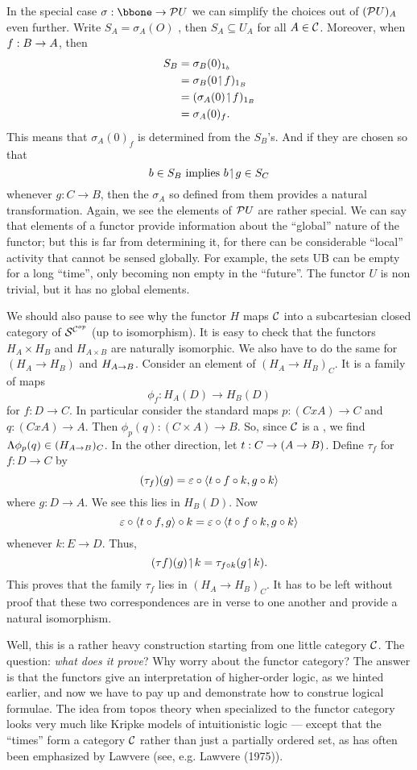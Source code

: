 In the special case $\sigma :\bbone \to \PU$ we can simplify the choices out of $(\mathcal P U)_A$
even further. Write $S_A= \sigma_A(O)$ , then $S_A\subseteq U_A$ for all $A \in \mathcal C$.
Moreover, when $f: B \rightarrow A$, then
\begin{align*}
S_B &= \sigma_B(0)_{{\mathrm 1}_b}\\
&= \sigma_B(0 \!\upharpoonleft\! f)_{{\mathrm 1} _B}\\
&= (\sigma_A(0) \!\upharpoonleft\! f)_{{\mathrm 1} _B}\\
&= \sigma_A(0)_f .
\end{align*}
This means that $\sigma_A(0)_f$ is determined from the $S_B$'s. And if they are chosen so
that
$$
b \in S_B {\textrm{ implies }} b \!\upharpoonleft\! g \in S_C
$$
whenever $g: C\to B$, then the $\sigma_A$ so defined from them provides a natural
transformation. Again, we see the elements of $\mathcal P U$ are rather special. We can say that
elements of a functor provide information about the ``global'' nature of the functor; but
this is far from determining it, for there can be considerable ``local'' activity that
cannot be sensed globally. For example, the sets UB can be empty for a long ``time'', only
becoming non empty in the ``future''. The functor $U$ is non trivial, but it has no global
elements.

We should also pause to see why the functor $H$ maps $\mathcal C$ into a subcartesian closed
category of $\mathcal S^{\mathcal C^{op}}$ (up to isomorphism). It is easy to check that the functors $H_A \times
H_B$ and $H_{A \times B}$ are naturally isomorphic. We also have to do the same for $(H_A
\to H_B)$ and $H_{A \rightarrow B}$. Consider an element of $(H_A\to H_B)_C$. It is a family of maps
$$
\phi_f : H_A(D) \to H_B(D)
$$
for $f: D\to C$. In particular consider the standard maps $p: (C x A) \to C$ and $q : (C x
A)\to A$. Then $\phi_p(q) : (C \times A)\to B$. So, since $\mathcal C$ is a \ccc, we find
$\Lambda\phi_p(q) \in (H_{A \rightarrow B})_C$. In the other direction, let $t : C\rightarrow (A \rightarrow B)$. Define
$\tau_f$ for $f : D\to C$ by
$$
(\tau_f)(g) = \varepsilon \circ \langle t \circ f \circ k, g \circ k \rangle
$$
where $g : D \to A$. We see this lies in $H_B(D)$. Now
$$
\varepsilon \circ \langle t \circ f, g\rangle \circ k = \varepsilon \circ \langle t \circ f \circ k, g \circ k\rangle
$$
whenever $k: E \to D$. Thus,
$$
(\tau f)(g) \!\upharpoonleft\! k = \tau_{f \circ k}(g \!\upharpoonleft\! k).
$$
This proves that the family $\tau_f$ lies in $(H_A \to H_B)_C$. It has to be left without
proof that these two correspondences are in verse to one another and provide a natural
isomorphism.

Well, this is a rather heavy construction starting from one little category $\mathcal C$. The
question: {\it what does it prove}? Why worry about the functor category? The answer is
that the functors give an interpretation of higher-order logic, as we hinted earlier, and
now we have to pay up and demonstrate how to construe logical formulae. The idea from
topos theory when specialized to the functor category looks very much like Kripke models
of intuitionistic logic --- except that the ``times'' form a category $\mathcal C$ rather than
just a partially ordered set, as has often been emphasized by Lawvere (see, e.g. Lawvere
(1975)).

